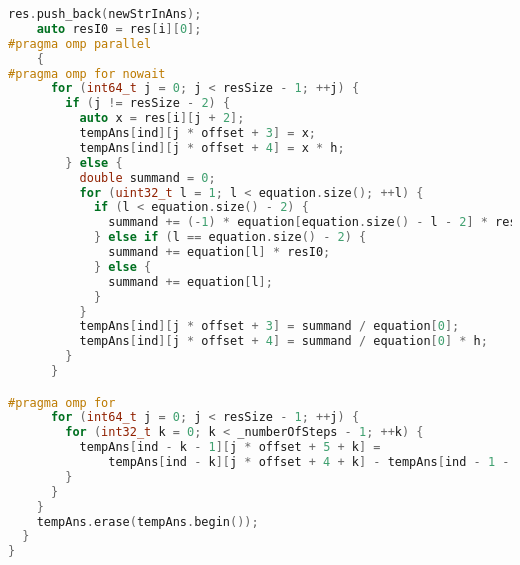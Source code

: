 \documentclass{report}
\begin{document}
\begin{lstlisting}[language=C++,caption=OpenMP версия]
    res.push_back(newStrInAns);
    auto resI0 = res[i][0];
#pragma omp parallel
    {
#pragma omp for nowait
      for (int64_t j = 0; j < resSize - 1; ++j) {
        if (j != resSize - 2) {
          auto x = res[i][j + 2];
          tempAns[ind][j * offset + 3] = x;
          tempAns[ind][j * offset + 4] = x * h;
        } else {
          double summand = 0;
          for (uint32_t l = 1; l < equation.size(); ++l) {
            if (l < equation.size() - 2) {
              summand += (-1) * equation[equation.size() - l - 2] * res[i][l];
            } else if (l == equation.size() - 2) {
              summand += equation[l] * resI0;
            } else {
              summand += equation[l];
            }
          }
          tempAns[ind][j * offset + 3] = summand / equation[0];
          tempAns[ind][j * offset + 4] = summand / equation[0] * h;
        }
      }

#pragma omp for
      for (int64_t j = 0; j < resSize - 1; ++j) {
        for (int32_t k = 0; k < _numberOfSteps - 1; ++k) {
          tempAns[ind - k - 1][j * offset + 5 + k] =
              tempAns[ind - k][j * offset + 4 + k] - tempAns[ind - 1 - k][j * offset + 4 + k];
        }
      }
    }
    tempAns.erase(tempAns.begin());
  }
}
\end{lstlisting}

\newpage
\end{document}
